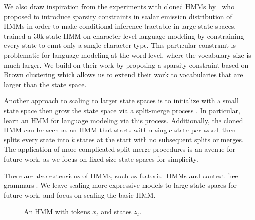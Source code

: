 \documentclass[11pt,a4paper]{article}
\begin{document}
We also draw inspiration from the experiments with
cloned HMMs by \citet{dedieu2019learning},
who proposed to introduce sparsity constraints in scalar
emission distribution of HMMs in order to make conditional inference
tractable in large state spaces.
\citet{dedieu2019learning} trained a 30k state HMM on character-level language modeling
by constraining every state to emit only a single character type.
This particular constraint is problematic for language modeling at the word level,
where the vocabulary size is much larger.
We build on their work by proposing a sparsity constraint based on
Brown clustering \citep{brown1992} which allows us to extend their
work to vocabularies that are larger than the state space.

Another approach to scaling to larger state spaces is to initialize
with a small state space then grow the state space via a split-merge process
\citep{petrov2006splitmerge,huang2011thesis}.
In particular, \citet{huang2011thesis} learn an HMM for language modeling
via this process.
Additionally, the cloned HMM \citep{dedieu2019learning} can be seen
as an HMM that starts with a single state per word,
then splits every state into $k$ states at the start
with no subsequent splits or merges.
The application of more complicated split-merge
procedures is an avenue for future work,
as we focus on fixed-size state spaces for simplicity.

There are also extensions of HMMs, such as factorial HMMs \cite{zoubin1997fhmm,nepal2013fhmm}
and context free grammars \citep{kim2019cpcfg}.
We leave scaling more expressive models to large state spaces for future work,
and focus on scaling the basic HMM.

\begin{figure}[t]
\centering
{}

\caption{
\label{fig:hmm}
An HMM with tokens $x_t$ and states $z_t$.
}
\end{figure}
\end{document}
